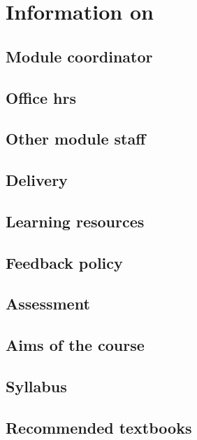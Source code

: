 \renewcommand{\prevpart}{0 }
\renewcommand{\thispart}{0 }
\renewcommand{\nextpart}{0 }



\section{Information on \modulename}

\subsection{Module coordinator}


\subsection{Office hrs}


\subsection{Other module staff}


\subsection{Delivery}


\subsection{Learning resources}

\subsection{Feedback policy}


\subsection{Assessment}


\subsection{Aims of the course}


\subsection{Syllabus}


\subsection{Recommended textbooks}


